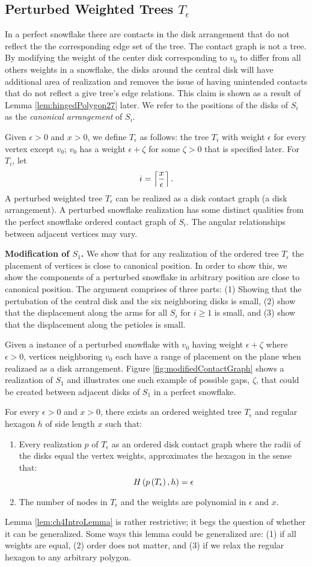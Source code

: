 \subsection{Perturbed Weighted Trees $T_\epsilon$}
In a perfect snowflake there are contacts in the disk arrangement that do not reflect the the corresponding edge set of the tree.  
The contact graph is not a tree.
By modifying the weight of the center disk corresponding to $v_0$ to differ from all others weights in a snowflake, the disks around the central disk will have additional area of realization and removes the issue of having unintended contacts that do not reflect a give tree's edge relations.  
This claim is shown as a result of Lemma \ref{lem:hingedPolygon27} later.
We refer to the positions of the disks of $S_i$ as the \textit{canonical arrangement} of $S_i$.

Given $\epsilon > 0$ and $x >0$, we define $T_\epsilon$ as follows: the tree $T_i$ with weight $\epsilon$ for every vertex except $v_0$; $v_0$ has a weight $\epsilon + \zeta$ for some $\zeta>0$ that is specified later.  For $T_i$, let $$i = \left\lceil \frac{x}{\epsilon} \right\rceil .$$ 
A perturbed weighted tree $T_\epsilon$ can be realized as a disk contact graph (a disk arrangement).  
A perturbed snowflake realization has some distinct qualities from the perfect snowflake ordered contact graph of $S_i$.    
The angular relationships between adjacent vertices may vary.

\textbf{Modification of $S_1$.}
We show that for any realization of the ordered tree $T_\epsilon$
 the placement of vertices is close to canonical position.  
In order to show this, we show the components of a perturbed snowflake in arbitrary position  are close to canonical position.  
The argument comprises of three parts: (1) Showing that the pertubation of the central disk and the six neighboring disks is small, (2) show that the displacement along the arms for all $S_i$ for $i \geq 1$ is small, and (3) show that the displacement along the petioles is small.  

Given a instance of a perturbed snowflake with $v_0$ having weight $\epsilon + \zeta$ where $\epsilon > 0$, vertices neighboring $v_0$ each have a range of placement on the plane when realizaed as a disk arrangement. 
Figure \ref{fig:modifiedContactGraph} shows a realization of $S_1$ and illustrates one such example of possible gaps, $\zeta$, that could be created between adjacent disks of $S_1$ in a perfect snowflake.

\begin{lem}\label{lem:ch4IntroLemma}
For every $\epsilon > 0$ and $x>0$, there exists an ordered weighted tree $T_\epsilon$ and regular hexagon $h$ of side length $x$ such that:
\begin{enumerate}
\item Every realization $p$ of $T_\epsilon$ as an ordered disk contact graph where the radii of the disks equal the vertex weights, approximates the hexagon in the sense that:
$$H\left( p\left( T_\epsilon \right),h \right)=\epsilon$$
\item The number of nodes in $T_\epsilon$ and the weights are polynomial in $\epsilon$ and $x$.
\end{enumerate}
\end{lem} 

Lemma \ref{lem:ch4IntroLemma} is rather restrictive; it begs the question of whether it can be generalized. Some ways this lemma could be generalized are: (1) if all weights are equal, (2) order does not matter, and (3) if we relax the regular hexagon to any arbitrary polygon. 
  
 